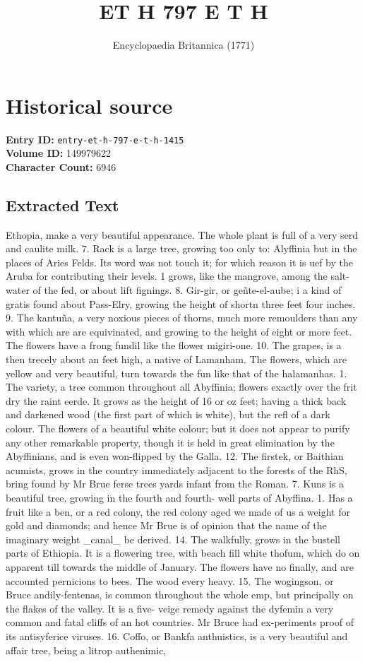 \documentclass{article}
\title{ET H  797  E T H}
\date{Encyclopaedia Britannica (1771)}
\begin{document}
\maketitle

\section*{Historical source}
\textbf{Entry ID:} \texttt{entry-et-h-797-e-t-h-1415} \\
\textbf{Volume ID:} 149979622 \\
\textbf{Character Count:} 6946

\subsection*{Extracted Text}
Ethopia, make a very beautiful appearance. The whole plant is full of a very serd and caulite milk. 7. Rack is a large tree, growing too only to: Alyffinia but in the places of Aries Felds. Its word was not touch it; for which reason it is uef by the Aruba for contributing their levels. 1 grows, like the mangrove, among the salt-water of the fed, or about lift fignings. 8. Gir-gir, or geñte-el-aube; i a kind of gratis found about Pass-Elry, growing the height of shortn three feet four inches. 9. The kantuña, a very noxious pieces of thorns, much more remoulders than any with which are are equivinated, and growing to the height of eight or more feet. The flowers have a frong fundil like the flower migiri-one. 10. The grapes, is a then trecely about an feet high, a native of Lamanham. The flowers, which are yellow and very beautiful, turn towards the fun like that of the halamanhas. 1. The variety, a tree common throughout all Abyffinia; flowers exactly over the frit dry the raint eerde. It grows as the height of 16 or oz feet; having a thick back and darkened wood (the first part of which is white), but the refl of a dark colour. The flowers of a beautiful white colour; but it does not appear to purify any other remarkable property, though it is held in great elimination by the Abyffinians, and is even won-flipped by the Galla. 12. The firstek, or Baithian acumists, grows in the country immediately adjacent to the forests of the RhS, bring found by Mr Brue ferse trees yards infant from the Roman. 7. Kuns is a beautiful tree, growing in the fourth and fourth- well parts of Abyffina. 1. Has a fruit like a ben, or a red colony, the red colony aged we made of us a weight for gold and diamonds; and hence Mr Brue is of opinion that the name of the imaginary weight \_canal\_ be derived. 14. The walkfully, grows in the bustell parts of Ethiopia. It is a flowering tree, with beach fill white thofum, which do on apparent till towards the middle of January. The flowers have no finally, and are accounted pernicions to bees. The wood every heavy. 15. The wogingson, or Bruce andily-fentenas, is common throughout the whole emp, but principally on the flakes of the valley. It is a five- veige remedy against the dyfemin a very common and fatal cliffs of an hot countries. Mr Bruce had ex-periments proof of its antisyferice viruses. 16. Coffo, or Bankfa anthuistics, is a very beautiful and affair tree, being a litrop authenimic, 
\end{document}
